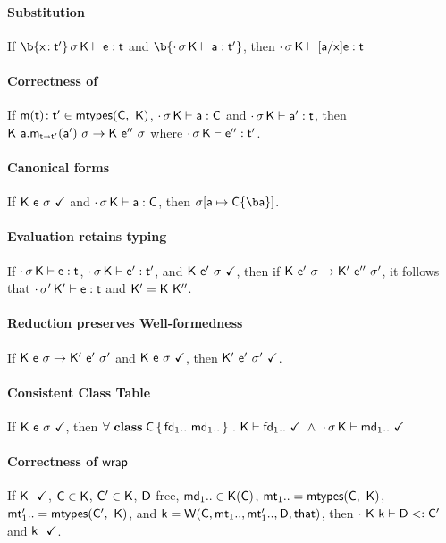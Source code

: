 \documentclass[acmlarge, anonymous, authordraft, review]{acmart} %
\begin{document}
\paragraph{Substitution}$~$\\
If $\EnvType{\b{\HT\x\tp}}\s\K\e\t$ and $\b{\EnvType\cdot\s\K\a\tp}$, then $\EnvType\cdot\s\K{[\a/\x]\e}\t$

\paragraph{Correctness of \classoff{\C}{\K}}$~$\\
If $\Mtype\m{\t}\tp \in \classoff{\C}{\K}$, $\EnvType\cdot\s\K\a\C$ and 
$\EnvType\cdot\s\K\ap\t$, then $\Reduce \K{\KCall\a\m{\ap}{\t}{\tp}}\s \K\epp\s$ where $\EnvType\cdot\s\K\epp\tp$. 

\paragraph{Canonical forms}$~$\\
If $\WFp\K{\e~\s}$ and $\EnvType\cdot\s\K\a\C$, then $\s[\a\mapsto{\obj\C{\b\a}}]$.

\paragraph{Evaluation retains typing}$~$\\ \label{lem:ert}
If $\EnvType\cdot\s\K\e\t$, $\EnvType\cdot\s\K\ep\tp$, and $\WFp\K{\ep~\s}$, then if $\Reduce\K\ep\s\Kp\epp\sp$, it follows that $\EnvType\cdot\sp\Kp\e\t$ and ${{\sf{K'}}} = {\sf{K}}~{{\sf{K''}}}$.

\paragraph{Reduction preserves Well-formedness}$~$\\
If $\Reduce \K\e\s \Kp\ep\sp$ and $\WFp\K{\e~\s}$, then $\WFp\Kp{\ep~\sp}$. 

\paragraph{Consistent Class Table}$~$\\
If $\WFp\K{\e~\s}$, then $\forall~\Class\C{\fd[1]..}{\md[1]..}~.~\WFtype\K{\fd[1]..}~\wedge~\WF\cdot\s\K{\md[1]..}$

\paragraph{Correctness of ${\sf{wrap}}$}$~$\\
If $\WFp \K$, $\C \in \K$, ${\sf{C'}} \in {\sf{K}}$, $\D$ free, $\md[1].. \In\App\K\C$, $\mt[1].. = \classoff\C\K$, $\mtp[1].. = \classoff\Cp\K$, and $\k = \wrap\C{\mt[1].. }{\mtp[1]..}\D\that$, then $\StrSub\cdot{\K~\k}\D\Cp$ and $\WFp \k$.
\end{document}

